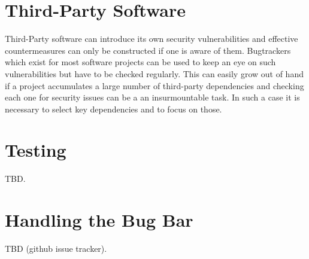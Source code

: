\section{Third-Party Software}
Third-Party software can introduce its own security vulnerabilities and effective countermeasures can only be constructed if one is aware of them. Bugtrackers which exist for most software projects can be used to keep an eye on such vulnerabilities but have to be checked regularly. This can easily grow out of hand if a project accumulates a large number of third-party dependencies and checking each one for security issues can be a an insurmountable task. In such a case it is necessary to select key dependencies and to focus on those.

\section{Testing}

TBD.

\section{Handling the Bug Bar}

TBD (github issue tracker).
